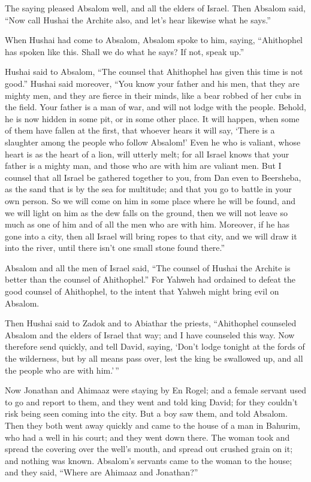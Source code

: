  The saying pleased Absalom well, and all the elders of
Israel.  Then Absalom said, ``Now call Hushai the Archite
also, and let's hear likewise what he says.''

 When Hushai had come to Absalom, Absalom spoke to him,
saying, ``Ahithophel has spoken like this. Shall we do what he says? If
not, speak up.''

 Hushai said to Absalom, ``The counsel that Ahithophel has
given this time is not good.''  Hushai said moreover, ``You
know your father and his men, that they are mighty men, and they are
fierce in their minds, like a bear robbed of her cubs in the field. Your
father is a man of war, and will not lodge with the people. 
Behold, he is now hidden in some pit, or in some other place. It will
happen, when some of them have fallen at the first, that whoever hears
it will say, `There is a slaughter among the people who follow Absalom!'
 Even he who is valiant, whose heart is as the heart of a
lion, will utterly melt; for all Israel knows that your father is a
mighty man, and those who are with him are valiant men. 
But I counsel that all Israel be gathered together to you, from Dan even
to Beersheba, as the sand that is by the sea for multitude; and that you
go to battle in your own person.  So we will come on him in
some place where he will be found, and we will light on him as the dew
falls on the ground, then we will not leave so much as one of him and of
all the men who are with him.  Moreover, if he has gone
into a city, then all Israel will bring ropes to that city, and we will
draw it into the river, until there isn't one small stone found there.''

 Absalom and all the men of Israel said, ``The counsel of
Hushai the Archite is better than the counsel of Ahithophel.'' For
Yahweh had ordained to defeat the good counsel of Ahithophel, to the
intent that Yahweh might bring evil on Absalom.

 Then Hushai said to Zadok and to Abiathar the priests,
``Ahithophel counseled Absalom and the elders of Israel that way; and I
have counseled this way.  Now therefore send quickly, and
tell David, saying, `Don't lodge tonight at the fords of the wilderness,
but by all means pass over, lest the king be swallowed up, and all the
people who are with him.'\,''

 Now Jonathan and Ahimaaz were staying by En Rogel; and a
female servant used to go and report to them, and they went and told
king David; for they couldn't risk being seen coming into the city.
 But a boy saw them, and told Absalom. Then they both went
away quickly and came to the house of a man in Bahurim, who had a well
in his court; and they went down there.  The woman took and
spread the covering over the well's mouth, and spread out crushed grain
on it; and nothing was known.  Absalom's servants came to
the woman to the house; and they said, ``Where are Ahimaaz and
Jonathan?''

